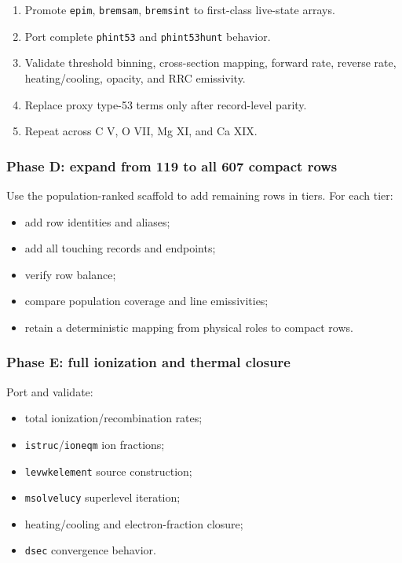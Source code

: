 \documentclass[
  10pt,
]{article}
\newcommand{\passthrough}[1]{#1}
\providecommand{\tightlist}{%
  \setlength{\itemsep}{0pt}\setlength{\parskip}{0pt}}
\begin{document}
\begin{enumerate}
\def\labelenumi{\arabic{enumi}.}
\tightlist
\item
  Promote \passthrough{\lstinline!epim!},
  \passthrough{\lstinline!bremsam!}, \passthrough{\lstinline!bremsint!}
  to first-class live-state arrays.
\item
  Port complete \passthrough{\lstinline!phint53!} and
  \passthrough{\lstinline!phint53hunt!} behavior.
\item
  Validate threshold binning, cross-section mapping, forward rate,
  reverse rate, heating/cooling, opacity, and RRC emissivity.
\item
  Replace proxy type-53 terms only after record-level parity.
\item
  Repeat across C V, O VII, Mg XI, and Ca XIX.
\end{enumerate}

\subsubsection{Phase D: expand from 119 to all 607 compact
rows}\label{phase-d-expand-from-119-to-all-607-compact-rows}

Use the population-ranked scaffold to add remaining rows in tiers. For
each tier:

\begin{itemize}
\tightlist
\item
  add row identities and aliases;
\item
  add all touching records and endpoints;
\item
  verify row balance;
\item
  compare population coverage and line emissivities;
\item
  retain a deterministic mapping from physical roles to compact rows.
\end{itemize}

\subsubsection{Phase E: full ionization and thermal
closure}\label{phase-e-full-ionization-and-thermal-closure}

Port and validate:

\begin{itemize}
\tightlist
\item
  total ionization/recombination rates;
\item
  \passthrough{\lstinline!istruc!}/\passthrough{\lstinline!ioneqm!} ion
  fractions;
\item
  \passthrough{\lstinline!levwkelement!} source construction;
\item
  \passthrough{\lstinline!msolvelucy!} superlevel iteration;
\item
  heating/cooling and electron-fraction closure;
\item
  \passthrough{\lstinline!dsec!} convergence behavior.
\end{itemize}
\end{document}
